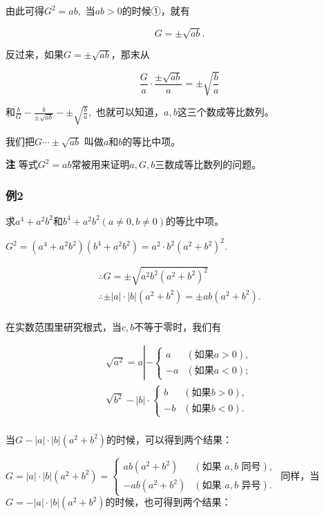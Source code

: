 由此可得\(G^{2} = ab,\) 当\(ab > 0\)的时候①，就有

\[
G = \pm \sqrt{a b}.
\]

反过来，如果\(G = \pm \sqrt{ab}\)，那末从

\[
\frac{G}{a} \cdot \frac{\pm \sqrt{a b}}{a} = \pm \sqrt{\frac{b}{a}}
\]

和\(\frac{b}{G} -\frac{b}{\pm\sqrt{ab}} -\pm \sqrt{\frac{b}{a}},\)
也就可以知道，\(a, b\)这三个数成等比数列。

我们把\(G \cdots \pm \sqrt{ab}\) 叫做\(a\)和\(b\)的等比中项。

\textbf{注}
等式\(G^{2} = ab\)常被用来证明\(a, G, b\)三数成等比数列的问题。

\subsubsection{例2}

求\(a^4 + a^2 b^2\)和\(b^4 + a^2 b^2 (a \neq 0, b \neq 0)\)的等比中项。

\(G^{2} = (a^{4} + a^{2}b^{2})(b^{4} + a^{2}b^{2}) = a^{2}\cdot b^{2}(a^{2} + b^{2})^{2}.\)

\[
\begin{array}{l} \therefore G = \pm \sqrt{a^{2} b^{2} (a^{2} + b^{2})^{2}} \\ \therefore \pm | a | \cdot | b | (a^{2} + b^{2}) = \pm a b (a^{2} + b^{2}). \\ \end{array}
\]

 在实数范围里研究根式，当\(c, b\)不等于零时，我们有

\[
\begin{array}{l} \sqrt{a^{2}} = a \left| - \left\{ \begin{array}{ll} a & (\text{如果} a > 0), \\ - a & (\text{如果} a < 0); \end{array} \right. \right. \\ \sqrt{b^{2}} - | b | \cdot \left\{ \begin{array}{ll} b & (\text{如果} b > 0), \\ - b & (\text{如果} b < 0). \end{array} \right. \\ \end{array}
\]

当\(G - |a| \cdot |b| (a^2 + b^2)\)的时候，可以得到两个结果：

\(G = |a| \cdot |b| (a^2 + b^2) = \left\{ \begin{array}{ll} ab(a^2 + b^2) & (\text{如果 } a, b \text{ 同号}), \\ -ab(a^2 + b^2) & (\text{如果 } a, b \text{ 异号}). \end{array} \right.\)
同样，当\(G = -|a| \cdot |b| (a^2 + b^2)\)的时候，也可得到两个结果：

